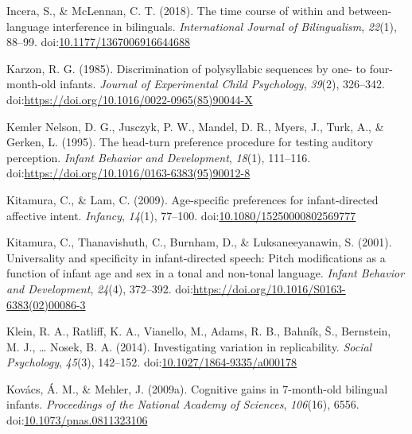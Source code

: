 \documentclass[,man,floatsintext]{apa6}
\begin{document}
\leavevmode\hypertarget{ref-incera_2018}{}%
Incera, S., \& McLennan, C. T. (2018). The time course of within and between-language interference in bilinguals. \emph{International Journal of Bilingualism}, \emph{22}(1), 88--99. doi:\href{https://doi.org/10.1177/1367006916644688}{10.1177/1367006916644688}

\leavevmode\hypertarget{ref-karzon_1985}{}%
Karzon, R. G. (1985). Discrimination of polysyllabic sequences by one- to four-month-old infants. \emph{Journal of Experimental Child Psychology}, \emph{39}(2), 326--342. doi:\href{https://doi.org/https://doi.org/10.1016/0022-0965(85)90044-X}{https://doi.org/10.1016/0022-0965(85)90044-X}

\leavevmode\hypertarget{ref-kemler_nelson_1995}{}%
Kemler Nelson, D. G., Jusczyk, P. W., Mandel, D. R., Myers, J., Turk, A., \& Gerken, L. (1995). The head-turn preference procedure for testing auditory perception. \emph{Infant Behavior and Development}, \emph{18}(1), 111--116. doi:\href{https://doi.org/https://doi.org/10.1016/0163-6383(95)90012-8}{https://doi.org/10.1016/0163-6383(95)90012-8}

\leavevmode\hypertarget{ref-kitamura_2009}{}%
Kitamura, C., \& Lam, C. (2009). Age-specific preferences for infant-directed affective intent. \emph{Infancy}, \emph{14}(1), 77--100. doi:\href{https://doi.org/10.1080/15250000802569777}{10.1080/15250000802569777}

\leavevmode\hypertarget{ref-kitamura_2001}{}%
Kitamura, C., Thanavishuth, C., Burnham, D., \& Luksaneeyanawin, S. (2001). Universality and specificity in infant-directed speech: Pitch modifications as a function of infant age and sex in a tonal and non-tonal language. \emph{Infant Behavior and Development}, \emph{24}(4), 372--392. doi:\href{https://doi.org/https://doi.org/10.1016/S0163-6383(02)00086-3}{https://doi.org/10.1016/S0163-6383(02)00086-3}

\leavevmode\hypertarget{ref-klein_2014}{}%
Klein, R. A., Ratliff, K. A., Vianello, M., Adams, R. B., Bahník, Š., Bernstein, M. J., \ldots{} Nosek, B. A. (2014). Investigating variation in replicability. \emph{Social Psychology}, \emph{45}(3), 142--152. doi:\href{https://doi.org/10.1027/1864-9335/a000178}{10.1027/1864-9335/a000178}

\leavevmode\hypertarget{ref-kovacs_2009a}{}%
Kovács, Á. M., \& Mehler, J. (2009a). Cognitive gains in 7-month-old bilingual infants. \emph{Proceedings of the National Academy of Sciences}, \emph{106}(16), 6556. doi:\href{https://doi.org/10.1073/pnas.0811323106}{10.1073/pnas.0811323106}
\end{document}
